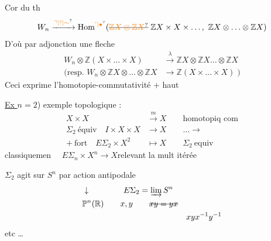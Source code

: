 Cor du th
\[
W_n\xrightarrow{\unsure{\urcorner|?|\sim}}\mathrm{Hom}^{\unsure{'|\bullet}}(\deleted{\unsure{\mathbb ZX\otimes\mathbb ZX}}\;\mathbb ZX\times X\times\ldots,\ \mathbb ZX\otimes\ldots\otimes\mathbb ZX)
\]
D'où par adjonction une fleche
\[
\begin{aligned}
W_n\otimes\mathbb Z(X\times\ldots\times X)&\xrightarrow{\lambda}\mathbb ZX\otimes\mathbb ZX\ldots\otimes\mathbb ZX\\
(\text{resp. }W_n\otimes\mathbb ZX\otimes\ldots\otimes\mathbb ZX&\longrightarrow\mathbb Z(X\times\ldots\times X)\;)
\end{aligned}
\]
Ceci exprime l'homotopie-commutativité  \(+\) haut

\uline{Ex \(n=2\)}) exemple topologique :
\[
\begin{aligned}
X\times X&\xrightarrow{m} X\qquad\text{homotopiq com}\\
\Sigma_2\ \text{équiv}\quad I\times X\times X&\longrightarrow X \qquad\ldots\longrightarrow\\
+\ \text{fort}\quad E\Sigma_2\times X^2&\longmapsto X\qquad \Sigma_2\ \text{equiv}
\end{aligned}
\]
classiquemen \(\quad E\Sigma_n\times X^n\longrightarrow X\)\quad relevant la mult itérée

\(\Sigma_2\) agit sur \(S^n\) par action antipodale
\[
\begin{aligned}
&\downarrow\hspace{4em} E\Sigma_2=\varinjlim S^n\\
&\mathbb P^n(\mathbb R)\qquad x,y\qquad\deleted{xy=yx}\\
&&xyx^{-1}y^{-1}
\end{aligned}
\]
etc \ldots


